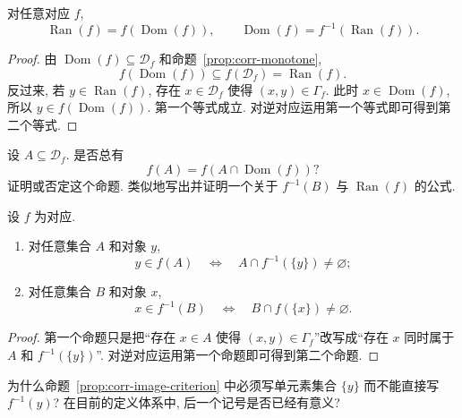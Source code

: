 \documentclass[usesamecnt, thmcnt=section, lang=cn, newtx, 10pt, scheme=chinese]{elegantbook}
\begin{document}
\begin{proposition}\label{prop:corr-domain-image-duality}
对任意对应 $f$,
\[
 \operatorname{Ran}(f)=f(\operatorname{Dom}(f)),
 \qquad
 \operatorname{Dom}(f)=f^{-1}(\operatorname{Ran}(f)).
\]
\end{proposition}

\begin{proof}
由 $\operatorname{Dom}(f)\subseteq\mathscr D_f$ 和命题~\ref{prop:corr-monotone},
\[
 f(\operatorname{Dom}(f))\subseteq f(\mathscr D_f)=\operatorname{Ran}(f).
\]
反过来, 若 $y\in\operatorname{Ran}(f)$, 存在 $x\in\mathscr D_f$ 使得 $(x,y)\in\Gamma_f$. 此时 $x\in\operatorname{Dom}(f)$, 所以 $y\in f(\operatorname{Dom}(f))$. 第一个等式成立. 对逆对应运用第一个等式即可得到第二个等式.
\end{proof}

\begin{exercise}\label{ex:corr-domain-image-duality}
设 $A\subseteq\mathscr D_f$. 是否总有
\[
 f(A)=f(A\cap\operatorname{Dom}(f))?
\]
证明或否定这个命题. 类似地写出并证明一个关于 $f^{-1}(B)$ 与 $\operatorname{Ran}(f)$ 的公式.
\end{exercise}

\begin{proposition}\label{prop:corr-image-criterion}
设 $f$ 为对应.
\begin{enumerate}[label=\rm(\arabic*)]
  \item 对任意集合 $A$ 和对象 $y$,
  \[
   y\in f(A)
   \quad\Leftrightarrow\quad
   A\cap f^{-1}(\{y\})\neq\varnothing;
  \]
  \item 对任意集合 $B$ 和对象 $x$,
  \[
   x\in f^{-1}(B)
   \quad\Leftrightarrow\quad
   B\cap f(\{x\})\neq\varnothing.
  \]
\end{enumerate}
\end{proposition}

\begin{proof}
第一个命题只是把``存在 $x\in A$ 使得 $(x,y)\in\Gamma_f$''改写成``存在 $x$ 同时属于 $A$ 和 $f^{-1}(\{y\})$''. 对逆对应运用第一个命题即可得到第二个命题.
\end{proof}

\begin{exercise}\label{ex:corr-image-criterion}
为什么命题~\ref{prop:corr-image-criterion} 中必须写单元素集合 $\{y\}$ 而不能直接写 $f^{-1}(y)$? 在目前的定义体系中, 后一个记号是否已经有意义?
\end{exercise}
\end{document}
